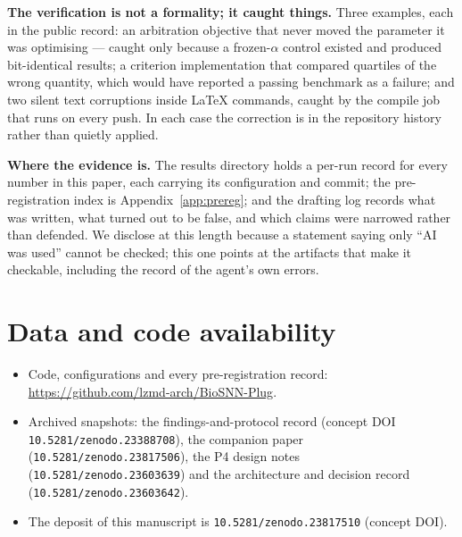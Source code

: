 \documentclass[11pt]{article}
\begin{document}
\textbf{The verification is not a formality; it caught things.} Three examples, each in the public
record: an arbitration objective that never moved the parameter it was optimising --- caught only
because a frozen-$\alpha$ control existed and produced bit-identical results; a criterion
implementation that compared quartiles of the wrong quantity, which would have reported a passing
benchmark as a failure; and two silent text corruptions inside \LaTeX{} commands, caught by the
compile job that runs on every push. In each case the correction is in the repository history
rather than quietly applied.

\textbf{Where the evidence is.} The results directory holds a per-run record for every number in
this paper, each carrying its configuration and commit; the pre-registration index is
Appendix~\ref{app:prereg}; and the drafting log records what was written, what turned out to be
false, and which claims were narrowed rather than defended. We disclose at this length because a
statement saying only ``AI was used'' cannot be checked; this one points at the artifacts that
make it checkable, including the record of the agent's own errors.

\section*{Data and code availability}

\begin{sloppypar}
\raggedright
\begin{itemize}
  \item Code, configurations and every pre-registration record:
  \url{https://github.com/lzmd-arch/BioSNN-Plug}.
  \item Archived snapshots: the findings-and-protocol record (concept DOI
  \nolinkurl{10.5281/zenodo.23388708}), the companion paper (\nolinkurl{10.5281/zenodo.23817506}),
  the P4 design notes (\nolinkurl{10.5281/zenodo.23603639}) and the architecture and decision
  record (\nolinkurl{10.5281/zenodo.23603642}).
  \item The deposit of this manuscript is \nolinkurl{10.5281/zenodo.23817510}
  (concept DOI).
\end{itemize}
\end{sloppypar}


\end{document}
